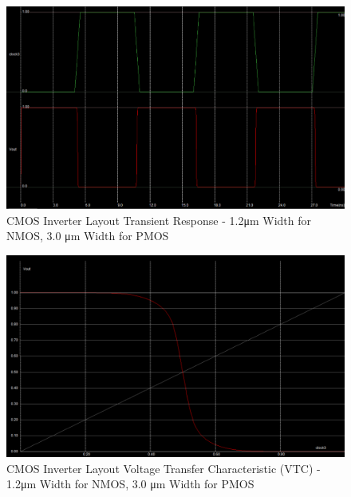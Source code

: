 \begin{figure}[h!]
	\centering
	\includegraphics[scale=0.50]{./images/inverter_transient_12nmos_30pmos.PNG}
	\caption{CMOS Inverter Layout Transient Response - 1.2\si{\micro\meter} Width for NMOS, 3.0 \si{\micro\meter} Width for PMOS}
	\label{fig:inverter_transient_12nmos_30pmos}
\end{figure}

\FloatBarrier

\FloatBarrier

\begin{figure}[h!]
	\centering
	\includegraphics[scale=0.50]{./images/inverter_vtc_12nmos_30pmos.PNG}
	\caption{CMOS Inverter Layout Voltage Transfer Characteristic (VTC) - 1.2\si{\micro\meter} Width for NMOS, 3.0 \si{\micro\meter} Width for PMOS}
	\label{fig:inverter_vtc_12nmos_30pmos}
\end{figure}

\FloatBarrier

\FloatBarrier

